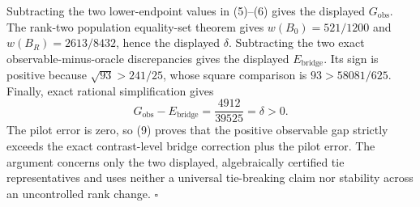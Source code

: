 Subtracting the two lower-endpoint values in (5)--(6) gives the displayed \(G_{\mathrm{obs}}\).  The rank-two population equality-set theorem gives \(w(B_0)=521/1200\) and \(w(B_R)=2613/8432\), hence the displayed \(\delta\).  Subtracting the two exact observable-minus-oracle discrepancies gives the displayed \(E_{\mathrm{bridge}}\).  Its sign is positive because \(\sqrt{93}>241/25\), whose square comparison is \(93>58081/625\).  Finally, exact rational simplification gives
\[
G_{\mathrm{obs}}-E_{\mathrm{bridge}}
=\frac{4912}{39525}=\delta>0.
\tag{9}
\]
The pilot error is zero, so (9) proves that the positive observable gap strictly exceeds the exact contrast-level bridge correction plus the pilot error.  The argument concerns only the two displayed, algebraically certified tie representatives and uses neither a universal tie-breaking claim nor stability across an uncontrolled rank change. \(\square\)